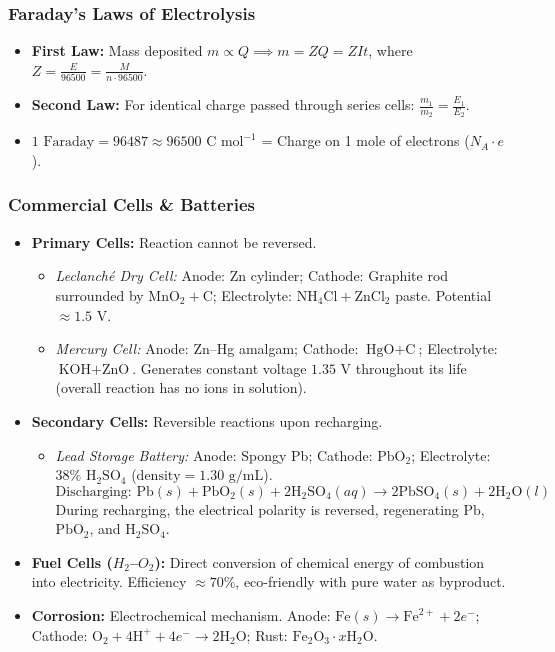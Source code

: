 \documentclass[11pt,a4paper]{article}
\begin{document}
\subsubsection{Faraday's Laws of Electrolysis}
\begin{itemize}[leftmargin=1.5em, itemsep=2pt]
  \item \textbf{First Law:} Mass deposited $m \propto Q \implies m = Z Q = Z I t$, where $Z = \frac{E}{96500} = \frac{M}{n \cdot 96500}$.
  \item \textbf{Second Law:} For identical charge passed through series cells: $\frac{m_1}{m_2} = \frac{E_1}{E_2}$.
  \item $1\text{ Faraday} = 96487 \approx 96500\text{ C mol}^{-1}$ = Charge on 1 mole of electrons ($N_A \cdot e$).
\end{itemize}

\subsubsection{Commercial Cells \& Batteries}
\begin{itemize}[leftmargin=1.5em, itemsep=2pt]
  \item \textbf{Primary Cells:} Reaction cannot be reversed.
  \begin{itemize}[label=$\circ$]
    \item \textit{Leclanché Dry Cell:} Anode: Zn cylinder; Cathode: Graphite rod surrounded by $\text{MnO}_2 + \text{C}$; Electrolyte: $\text{NH}_4\text{Cl} + \text{ZnCl}_2$ paste. Potential $\approx 1.5\text{ V}$.
    \item \textit{Mercury Cell:} Anode: Zn--Hg amalgam; Cathode: $\text{HgO} + \text{C}$; Electrolyte: $\text{KOH} + \text{ZnO}$. Generates constant voltage $1.35\text{ V}$ throughout its life (overall reaction has no ions in solution).
  \end{itemize}
  \item \textbf{Secondary Cells:} Reversible reactions upon recharging.
  \begin{itemize}[label=$\circ$]
    \item \textit{Lead Storage Battery:} Anode: Spongy Pb; Cathode: $\text{PbO}_2$; Electrolyte: $38\% \text{ H}_2\text{SO}_4$ ($\text{density} = 1.30\text{ g/mL}$).
    \[
      \text{Discharging: } \text{Pb}(s) + \text{PbO}_2(s) + 2\text{H}_2\text{SO}_4(aq) \xrightarrow{} 2\text{PbSO}_4(s) + 2\text{H}_2\text{O}(l)
    \]
    During recharging, the electrical polarity is reversed, regenerating $\text{Pb}$, $\text{PbO}_2$, and $\text{H}_2\text{SO}_4$.
  \end{itemize}
  \item \textbf{Fuel Cells ($H_2$--$O_2$):} Direct conversion of chemical energy of combustion into electricity. Efficiency $\approx 70\%$, eco-friendly with pure water as byproduct.
  \item \textbf{Corrosion:} Electrochemical mechanism. Anode: $\text{Fe}(s) \to \text{Fe}^{2+} + 2e^-$; Cathode: $\text{O}_2 + 4\text{H}^+ + 4e^- \to 2\text{H}_2\text{O}$; Rust: $\text{Fe}_2\text{O}_3 \cdot x\text{H}_2\text{O}$.
\end{itemize}
\end{document}
